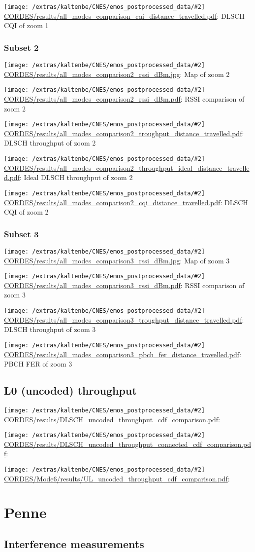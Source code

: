 \documentclass[a4paper,10pt]{article}
\newcommand{\printfile}[2][]{
 \begin{minipage}{8cm}
  \centering
  \texttt{[image: /extras/kaltenbe/CNES/emos\_postprocessed\_data/\#2]}
  \url{#2}: #1

 \end{minipage}
}
\begin{document}
\printfile[DLSCH CQI of zoom 1]{CORDES/results/all_modes_comparison_cqi_distance_travelled.pdf}

\subsubsection*{Subset 2}

\printfile[Map of zoom 2]{CORDES/results/all_modes_comparison2_rssi_dBm.jpg}
\printfile[RSSI comparison of zoom 2]{CORDES/results/all_modes_comparison2_rssi_dBm.pdf}

\printfile[DLSCH throughput of zoom 2]{CORDES/results/all_modes_comparison2_troughput_distance_travelled.pdf}
\printfile[Ideal DLSCH throughput of zoom 2]{CORDES/results/all_modes_comparison2_throughput_ideal_distance_travelled.pdf}

\printfile[DLSCH CQI of zoom 2]{CORDES/results/all_modes_comparison2_cqi_distance_travelled.pdf}

\subsubsection*{Subset 3}

\printfile[Map of zoom 3]{CORDES/results/all_modes_comparison3_rssi_dBm.jpg}
\printfile[RSSI comparison of zoom 3]{CORDES/results/all_modes_comparison3_rssi_dBm.pdf}

\printfile[DLSCH throughput of zoom 3]{CORDES/results/all_modes_comparison3_troughput_distance_travelled.pdf}
\printfile[PBCH FER of zoom 3]{CORDES/results/all_modes_comparison3_pbch_fer_distance_travelled.pdf}

\subsection{L0 (uncoded) throughput}

\printfile{CORDES/results/DLSCH_uncoded_throughput_cdf_comparison.pdf}
\printfile{CORDES/results/DLSCH_uncoded_throughput_connected_cdf_comparison.pdf}

\printfile{CORDES/Mode6/results/UL_uncoded_throughput_cdf_comparison.pdf}

\section{Penne}
\label{sec:penne}

\subsection{Interference measurements}
\end{document}
